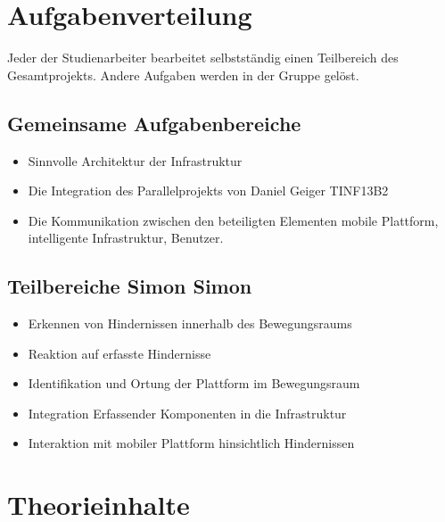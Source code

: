 
\chapter{Aufgabenverteilung}
Jeder der Studienarbeiter bearbeitet selbstständig einen Teilbereich des Gesamtprojekts. Andere Aufgaben werden in der Gruppe gelöst.

\section{Gemeinsame Aufgabenbereiche}
\begin{itemize}
\item Sinnvolle Architektur der Infrastruktur
\item Die Integration des Parallelprojekts von Daniel Geiger TINF13B2
\item Die Kommunikation zwischen den beteiligten Elementen mobile Plattform, intelligente Infrastruktur, Benutzer.
\end{itemize}

\section{Teilbereiche Simon Simon}
\begin{itemize}
\item Erkennen von Hindernissen innerhalb des Bewegungsraums
\item Reaktion auf erfasste Hindernisse
\item Identifikation und Ortung der Plattform im Bewegungsraum
\item Integration Erfassender Komponenten in die Infrastruktur
\item Interaktion mit mobiler Plattform hinsichtlich Hindernissen
\end{itemize}

\chapter{Theorieinhalte}
